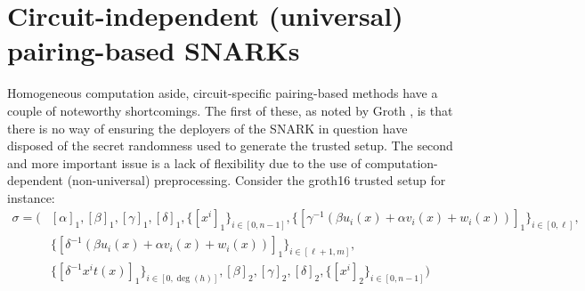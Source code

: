 \section{Circuit-independent (universal) pairing-based SNARKs}
\noindent Homogeneous computation aside, circuit-specific pairing-based methods have a couple of noteworthy shortcomings. The first of these, as noted by Groth \cite{grothupdatable}, is that there is no way of ensuring the deployers of the SNARK in question have disposed of the secret randomness used to generate the trusted setup. The second and more important issue is a lack of flexibility due to the use of computation-dependent (non-universal) preprocessing. Consider the groth16 trusted setup for instance: 
\begin{align}
\sigma = \Big( 
    &[\alpha]_1, [\beta]_1, [\gamma]_1, [\delta]_1, \{[x^i]_1\}_{i \in [0, n-1]}, \{[\gamma^{-1}(\beta u_i(x) + \alpha v_i(x) + w_i(x))]_1\}_{i \in [0, \ell]}, \\
    &\{[\delta^{-1}(\beta u_i(x) + \alpha v_i(x) + w_i(x))]_1\}_{i \in [\ell+1, m]}, \\
    &\{[\delta^{-1} x^i t(x)]_1\}_{i \in [0, \deg(h)]}, [\beta]_2, [\gamma]_2, [\delta]_2, \{[x^i]_2\}_{i \in [0, n-1]}
\Big)
\end{align}

